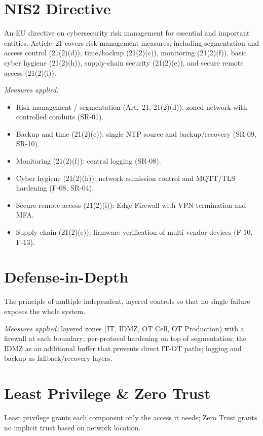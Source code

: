 \documentclass{report}
\begin{document}
\section{NIS2 Directive}
An EU directive on cybersecurity risk management for essential and important entities. Article~21 covers risk-management measures, including segmentation and access control (21(2)(d)), time/backup (21(2)(c)), monitoring (21(2)(f)), basic cyber hygiene (21(2)(h)), supply-chain security (21(2)(e)), and secure remote access (21(2)(i)).

\textit{Measures applied:}
\begin{itemize}[nosep]
  \item Risk management / segmentation (Art.~21, 21(2)(d)): zoned network with controlled conduits (SR-01).
  \item Backup and time (21(2)(c)): single NTP source and backup/recovery (SR-09, SR-10).
  \item Monitoring (21(2)(f)): central logging (SR-08).
  \item Cyber hygiene (21(2)(h)): network admission control and MQTT/TLS hardening (F-08, SR-04).
  \item Secure remote access (21(2)(i)): Edge Firewall with VPN termination and MFA.
  \item Supply chain (21(2)(e)): firmware verification of multi-vendor devices (F-10, F-13).
\end{itemize}

\section{Defense-in-Depth}
The principle of multiple independent, layered controls so that no single failure exposes the whole system.

\textit{Measures applied:} layered zones (IT, IDMZ, OT Cell, OT Production) with a firewall at each boundary; per-protocol hardening on top of segmentation; the IDMZ as an additional buffer that prevents direct IT-OT paths; logging and backup as fallback/recovery layers.

\section{Least Privilege \& Zero Trust}
Least privilege grants each component only the access it needs; Zero Trust grants no implicit trust based on network location.
\end{document}
